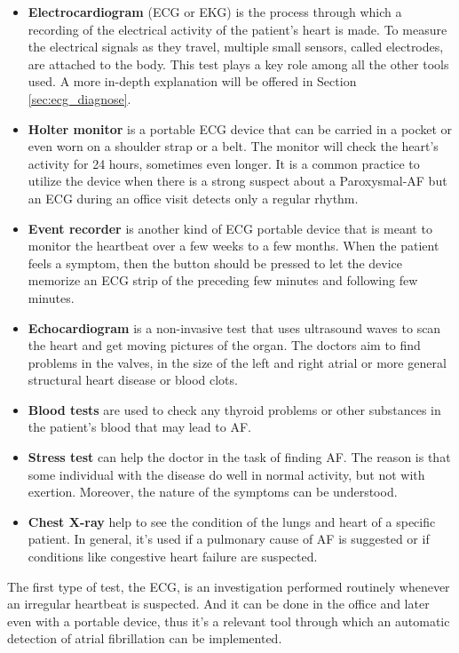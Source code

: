 \begin{itemize}
\item \textbf{Electrocardiogram} (ECG or EKG) is the process through which a recording of the electrical activity of the patient's heart is made. To measure the electrical signals as they travel, multiple small sensors, called electrodes, are attached to the body. This test plays a key role among all the other tools used. A more in-depth explanation will be offered in Section \ref{sec:ecg_diagnose}.
\item \textbf{Holter monitor} is a portable ECG device that can be carried in a pocket or even worn on a shoulder strap or a belt. The monitor will check the heart's activity for 24 hours, sometimes even longer. It is a common practice to utilize the device when there is a strong suspect about a Paroxysmal-AF but an ECG during an office visit detects only a regular rhythm.
\item \textbf{Event recorder} is another kind of ECG portable device that is meant to monitor the heartbeat over a few weeks to a few months. When the patient feels a symptom, then the button should be pressed to let the device memorize an ECG strip of the preceding few minutes and following few minutes.
\item \textbf{Echocardiogram} is a non-invasive test that uses ultrasound waves to scan the heart and get moving pictures of the organ. The doctors aim to find problems in the valves, in the size of the left and right atrial or more general structural heart disease or blood clots.
\item \textbf{Blood tests} are used to check any thyroid problems or other substances in the patient's blood that may lead to AF.
\item \textbf{Stress test} can help the doctor in the task of finding AF. The reason is that some individual with the disease do well in normal activity, but not with exertion. Moreover, the nature of the symptoms can be understood.
\item \textbf{Chest X-ray} help to see the condition of the lungs and heart of a specific patient. In general, it's used if a pulmonary cause of AF is suggested or if conditions like congestive heart failure are suspected.
\end{itemize}
The first type of test, the ECG, is an investigation performed routinely whenever an irregular heartbeat is suspected. And it can be done in the office and later even with a portable device, thus it's a relevant tool through which an automatic detection of atrial fibrillation can be implemented.
